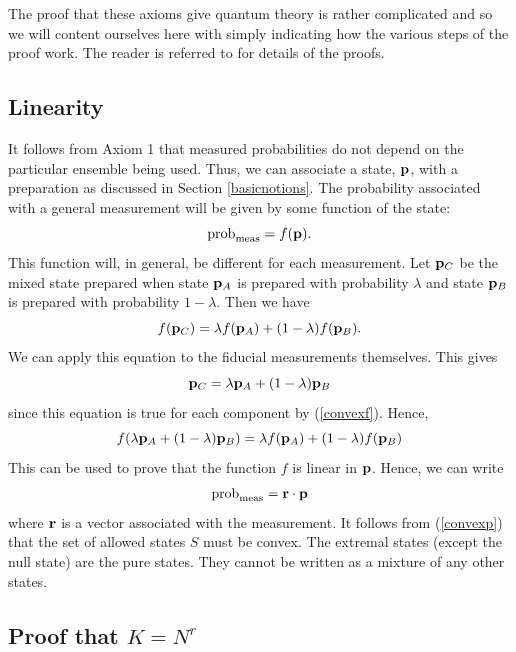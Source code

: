 \documentclass[12pt]{article}
\begin{document}
The proof that these axioms give quantum theory is rather complicated
and so we will content ourselves here with simply indicating how the
various steps of the proof work. The reader is referred to \cite{Hardy1}
for details of the proofs.

\subsection{Linearity}

It follows from Axiom 1 that measured probabilities do not depend on the
particular ensemble being used. Thus, we can associate a state, ${\bf
p}$, with a
preparation as discussed in Section \ref{basicnotions}.
The probability associated
with a general measurement will be given by some function of the state:
\begin{equation}
{\rm prob}_{\rm meas} = f({\bf p}).
\end{equation}
This function will, in general, be different for each measurement.
Let ${\bf p}_C$ be the mixed state prepared when state ${\bf p}_A$ is
prepared with probability $\lambda$ and state ${\bf p}_B$ is prepared
with probability $1-\lambda$.  Then we have
\begin{equation}\label{convexf}
f({\bf p}_C) = \lambda f({\bf p}_A)
+(1-\lambda) f({\bf p}_B).
\end{equation}
We can apply this equation to the fiducial measurements
themselves. This gives
\begin{equation}\label{convexp}
{\bf p}_C = \lambda {\bf p}_A+(1-\lambda){\bf p}_B
\end{equation}
since this equation is true for each component by (\ref{convexf}).
Hence,
\begin{equation}\label{convexpf}
f(\lambda {\bf p}_A+(1-\lambda){\bf p}_B)
= \lambda f({\bf p}_A)+(1-\lambda) f({\bf p}_B)
\end{equation}
This can be used to prove that the function $f$ is linear in ${\bf p}$.
Hence, we can write
\begin{equation}
{\rm prob}_{\rm meas}= {\bf r}\cdot {\bf p}
\end{equation}
where ${\bf r}$ is a vector associated with the measurement.
It follows from (\ref{convexp}) that the set of allowed states $S$ must
be convex.  The extremal states (except the null state) are the pure
states.  They cannot be written as a mixture of any other states.

\subsection{Proof that $K=N^r$}
\end{document}
